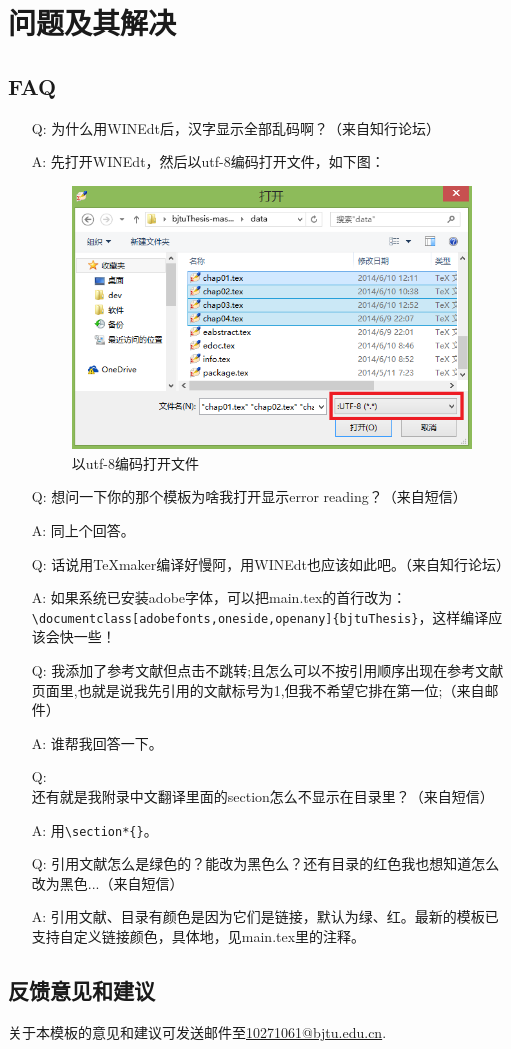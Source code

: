 \chapter{问题及其解决}
\section{FAQ}
\begin{enumerate}
  \item[Q:]为什么用WINEdt后，汉字显示全部乱码啊？（来自知行论坛）
  \item[A:]先打开WINEdt，然后以utf-8编码打开文件，如下图：\begin{figure}[!ht]\centering\includegraphics[scale=0.7]{figures/41}\caption{以utf-8编码打开文件}\label{f41}\end{figure}
  \item[Q:]想问一下你的那个模板为啥我打开显示error reading？（来自短信）
  \item[A:]同上个回答。
  \item[Q:]话说用TeXmaker编译好慢阿，用WINEdt也应该如此吧。（来自知行论坛）
  \item[A:]如果系统已安装adobe字体，可以把main.tex的首行改为：\verb|\documentclass[adobefonts,oneside,openany]{bjtuThesis}|，这样编译应该会快一些！
  \item[Q:]我添加了参考文献但点击不跳转;且怎么可以不按引用顺序出现在参考文献页面里,也就是说我先引用的文献标号为1,但我不希望它排在第一位;（来自邮件）
  \item[A:]谁帮我回答一下。
  \item[Q:]还有就是我附录中文翻译里面的section怎么不显示在目录里？（来自短信）
  \item[A:]用\verb|\section*{}|。
  \item[Q:]引用文献怎么是绿色的？能改为黑色么？还有目录的红色我也想知道怎么改为黑色...（来自短信）
  \item[A:]引用文献、目录有颜色是因为它们是链接，默认为绿、红。最新的模板已支持自定义链接颜色，具体地，见main.tex里的注释。
\end{enumerate}
\section{反馈意见和建议}
关于本模板的意见和建议可发送邮件至\href{mailto:10271061@bjtu.edu.cn}{10271061@bjtu.edu.cn}.

